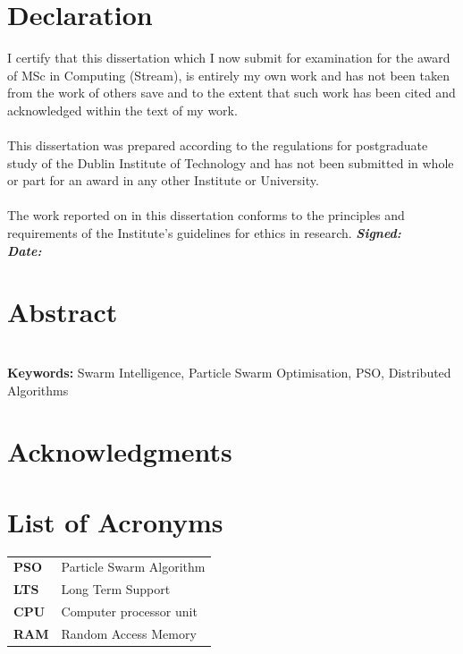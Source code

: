 \documentclass[oneside,12pt]{book}
\begin{document}
\chapter*{Declaration}
I certify that this dissertation which I now submit for examination for the award of
MSc in Computing (Stream), is entirely my own work and has not been taken
from the work of others save and to the extent that such work has been cited and
acknowledged within the text of my work.
\\
\\
This dissertation was prepared according to the regulations for postgraduate study of
the Dublin Institute of Technology and has not been submitted in whole or part for an
award in any other Institute or University.
\\
\\
The work reported on in this dissertation conforms to the principles and requirements
of the Institute’s guidelines for ethics in research.
\vfill
\noindent
\textit{\textbf{Signed:}}  \\

\noindent
\textit{\textbf{Date:}}
\vspace{0.8cm}

\chapter*{Abstract}
\par 

\\
\vfill
\noindent
\textbf{Keywords:} \quad Swarm Intelligence, Particle Swarm Optimisation, PSO, Distributed Algorithms

\chapter*{Acknowledgments}

\newpage
\tableofcontents

\listoffigures

\listoftables

\chapter*{List of Acronyms}
\begin{table}[H]
  \centering
    \begin{tabular}{ l l }
    \textbf{PSO} & Particle Swarm Algorithm \\
    \textbf{LTS} & Long Term Support \\
    \textbf{CPU} & Computer processor unit \\
    \textbf{RAM} & Random Access Memory \\
    \end{tabular}
\end{table}
\end{document}
